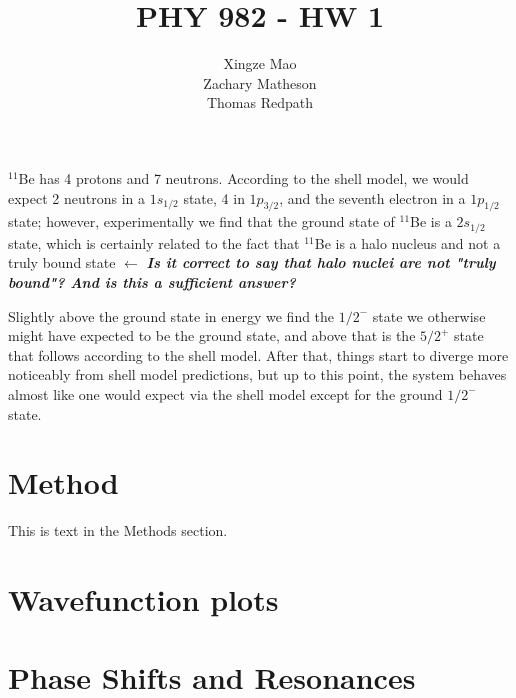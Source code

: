 \documentclass[]{scrartcl}
\title{PHY 982 - HW 1}
\author{Xingze Mao \\ Zachary Matheson \\ Thomas Redpath}
\date{}
\begin{document}
\maketitle

$^{11}$Be has 4 protons and 7 neutrons. According to the shell model, we would expect 2 neutrons in a $1s_{1/2}$ state, 4 in $1p_{3/2}$, and the seventh electron in a $1p_{1/2}$ state; however, experimentally we find that the ground state of $^{11}$Be is a $2s_{1/2}$ state, which is certainly related to the fact that $^{11}$Be is a halo nucleus and not a truly bound state $\leftarrow$ \textit{\textbf{Is it correct to say that halo nuclei are not "truly bound"? And is this a sufficient answer?}}

Slightly above the ground state in energy we find the $1/2^-$ state we otherwise might have expected to be the ground state, and above that is the $5/2^+$ state that follows according to the shell model. After that, things start to diverge more noticeably from shell model predictions, but up to this point, the system behaves almost like one would expect via the shell model except for the ground $1/2^-$ state.

\section*{Method}\nonumber
This is text in the Methods section.\\

\section*{Wavefunction plots}

\begin{figure}

\end{figure}


\section*{Phase Shifts and Resonances}
\end{document}
